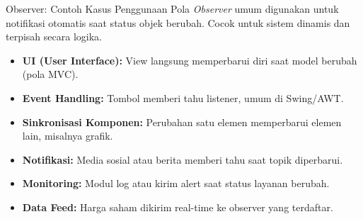 \documentclass[aspectratio=169, table]{beamer}
\begin{document}
\begin{frame}{Observer: Contoh Kasus Penggunaan}
	\vspace{10pt}
	Pola \textit{Observer} umum digunakan untuk notifikasi otomatis saat status objek berubah. Cocok untuk sistem dinamis dan terpisah secara logika.
	
	\vspace{6pt}
	\begin{itemize}
		\item \textbf{UI (User Interface):} View langsung memperbarui diri saat model berubah (pola MVC).
		
		\item \textbf{Event Handling:} Tombol memberi tahu listener, umum di Swing/AWT.
		
		\item \textbf{Sinkronisasi Komponen:} Perubahan satu elemen memperbarui elemen lain, misalnya grafik.
		
		\item \textbf{Notifikasi:} Media sosial atau berita memberi tahu saat topik diperbarui.
		
		\item \textbf{Monitoring:} Modul log atau kirim alert saat status layanan berubah.
		
		\item \textbf{Data Feed:} Harga saham dikirim real-time ke observer yang terdaftar.
	\end{itemize}
\end{frame}
\end{document}
